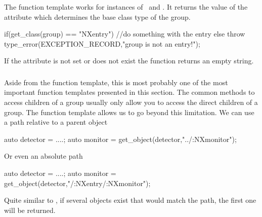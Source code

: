 \subsubsection{}


\subsubsection{}

The  function template works for instances of \nxgroup\ and
\nxobject. It returns the value of the  attribute which 
determines the base class type of the group.
\begin{cppcode}
if(get_class(group) == "NXentry")
    //do something with the entry
else
    throw type_error(EXCEPTION_RECORD,"group is not an entry!");
\end{cppcode}
If the attribute is not set or does not exist the function returns an empty
string. 
\subsubsection{}

Aside from the  function template, this is most probably one of
the most important function templates presented in this section. 
The common methods to access children of a group usually only allow you to 
access the direct children of a group. The  function template 
allows us to go beyond this limitation. 
We can use a path relative to a parent object
\begin{cppcode}
auto detector = ....;
auto monitor  = get_object(detector,"../:NXmonitor");
\end{cppcode}
Or even an absolute path
\begin{cppcode}
auto detector = ....;
auto monitor  = get_object(detector,"/:NXentry/:NXmonitor");
\end{cppcode}
Quite similar to , if several objects exist that would match
the path, the first one will be returned. 

\subsubsection{}

